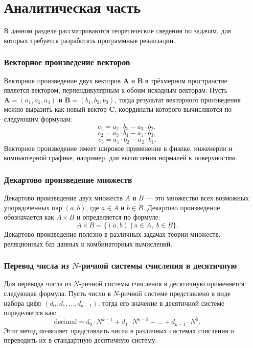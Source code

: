 \chapter{Аналитическая часть}

В данном разделе рассматриваются теоретические сведения по задачам, для которых требуется разработать программные реализации.

\subsection{Векторное произведение векторов}
Векторное произведение двух векторов \(\mathbf{A}\) и \(\mathbf{B}\) в трёхмерном пространстве является вектором, перпендикулярным к обоим исходным векторам. Пусть \(\mathbf{A} = (a_1, a_2, a_3)\) и \(\mathbf{B} = (b_1, b_2, b_3)\), тогда результат векторного произведения можно выразить как новый вектор \(\mathbf{C}\), координаты которого вычисляются по следующим формулам:
\[
c_1 = a_2 \cdot b_3 - a_3 \cdot b_2,
\]
\[
c_2 = a_3 \cdot b_1 - a_1 \cdot b_3,
\]
\[
c_3 = a_1 \cdot b_2 - a_2 \cdot b_1.
\]
Векторное произведение имеет широкое применение в физике, инженерии и компьютерной графике, например, для вычисления нормалей к поверхностям.

\subsection{Декартово произведение множеств}
Декартово произведение двух множеств \(A\) и \(B\) — это множество всех возможных упорядоченных пар \((a, b)\), где \(a \in A\) и \(b \in B\). Декартово произведение обозначается как \(A \times B\) и определяется по формуле:
\[
A \times B = \{ (a, b) \; | \; a \in A, \; b \in B \}.
\]
Декартово произведение полезно в различных задачах теории множеств, реляционных баз данных и комбинаторных вычислений.

\subsection{Перевод числа из \(N\)-ричной системы счисления в десятичную}
Для перевода числа из \(N\)-ричной системы счисления в десятичную применяется следующая формула. Пусть число в \(N\)-ричной системе представлено в виде набора цифр \( (d_0, d_1, \ldots, d_{k-1}) \), тогда его значение в десятичной системе определяется как:
\[
\text{decimal} = d_0 \cdot N^{k-1} + d_1 \cdot N^{k-2} + \ldots + d_{k-1} \cdot N^0.
\]
Этот метод позволяет представлять числа в различных системах счисления и переводить их в стандартную десятичную систему.
